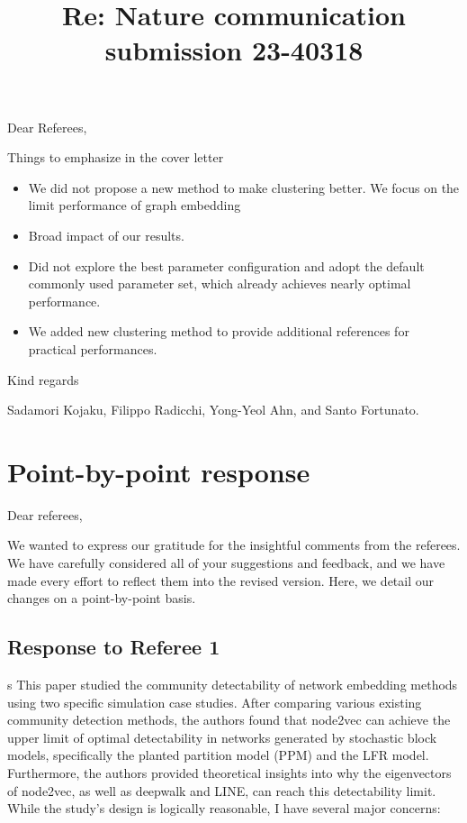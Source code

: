 \documentclass[12pt]{article}
\title{Re: Nature communication submission 23-40318}
\date{}
\makeatletter
\newcounter{comment}[subsection]
\newcommand{\rcomment}[1]{%
\vspace{10pt}
\begin{sectionbox}
s #1
\end{sectionbox}
}
\renewcommand{\maketitle}{\bgroup\setlength{\parindent}{0pt}
\begin{flushleft}
\Large  \textbf{\@title}
\end{flushleft}\egroup
}
\makeatother
\begin{document}
\maketitle

\bigskip
\thispagestyle{empty}
\vspace{-0.4cm}
\noindent Dear Referees,\\
\vspace{-0.25cm}

Things to emphasize in the cover letter
\begin{itemize}
\item We did not propose a new method to make clustering better. We focus on the limit performance of graph embedding 
\item Broad impact of our results.   
\item Did not explore the best parameter configuration and adopt the default commonly used parameter set, which already achieves nearly optimal performance. 
\item We added new clustering method to provide additional references for practical performances.  
\end{itemize}


\bigskip

Kind regards

\bigskip

Sadamori Kojaku, Filippo Radicchi, Yong-Yeol Ahn, and Santo Fortunato.

\clearpage
{}
\setcounter{page}{1}
\tableofcontents
\clearpage

\section{Point-by-point response}
Dear referees,

We wanted to express our gratitude for the insightful comments from the referees. We have carefully considered all of your suggestions and feedback, and we have made every effort to reflect them into the revised version. Here, we detail our changes on a point-by-point basis.

\subsection{Response to Referee 1}
\setcounter{section}{1}


\rcomment{%
This paper studied the community detectability of network embedding methods using two specific simulation case studies. After comparing various existing community detection methods, the authors found that node2vec can achieve the upper limit of optimal detectability in networks generated by stochastic block models, specifically the planted partition model (PPM) and the LFR model. Furthermore, the authors provided theoretical insights into why the eigenvectors of node2vec, as well as deepwalk and LINE, can reach this detectability limit. While the study's design is logically reasonable, I have several major concerns:}
\end{document}
